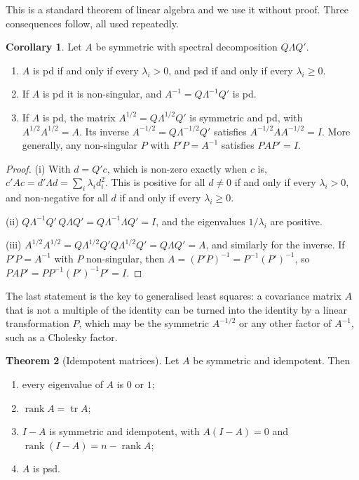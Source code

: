 \documentclass[11pt,a4paper]{article}
\numberwithin{equation}{section}
\DeclareMathOperator{\tr}{tr}
\DeclareMathOperator{\rank}{rank}
\theoremstyle{definition}
\newtheorem{thm}{Theorem}[subsection]
\newtheorem{coro}[thm]{Corollary}
\begin{document}
This is a standard theorem of linear algebra and we use it without proof. Three consequences follow, all used repeatedly.

\begin{coro}
\label{coro:pd}
Let $A$ be symmetric with spectral decomposition $Q\Lambda Q'$.
\begin{enumerate}[label=(\roman*)]
\item $A$ is pd if and only if every $\lambda_i > 0$, and psd if and only if every $\lambda_i \geq 0$.
\item If $A$ is pd it is non-singular, and $A^{-1} = Q\Lambda^{-1}Q'$ is pd.
\item If $A$ is pd, the matrix $A^{1/2} = Q\Lambda^{1/2}Q'$ is symmetric and pd, with $A^{1/2}A^{1/2} = A$. Its inverse $A^{-1/2} = Q\Lambda^{-1/2}Q'$
satisfies $A^{-1/2}AA^{-1/2} = I$. More generally, any non-singular $P$ with $P'P = A^{-1}$ satisfies $PAP' = I$.
\end{enumerate}
\end{coro}

\begin{proof}
(i) With $d = Q'c$, which is non-zero exactly when $c$ is, $c'Ac = d'\Lambda d = \sum_i\lambda_id_i^2$. This is positive for all $d \neq 0$ if and only if
every $\lambda_i > 0$, and non-negative for all $d$ if and only if every $\lambda_i \geq 0$.

(ii) $Q\Lambda^{-1}Q'\,Q\Lambda Q' = Q\Lambda^{-1}\Lambda Q' = I$, and the eigenvalues $1/\lambda_i$ are positive.

(iii) $A^{1/2}A^{1/2} = Q\Lambda^{1/2}Q'Q\Lambda^{1/2}Q' = Q\Lambda Q' = A$, and similarly for the inverse. If $P'P = A^{-1}$ with $P$ non-singular, then
$A = (P'P)^{-1} = P^{-1}(P')^{-1}$, so $PAP' = PP^{-1}(P')^{-1}P' = I$.
\end{proof}

The last statement is the key to generalised least squares: a covariance matrix $A$ that is not a multiple of the identity can be turned into the
identity by a linear transformation $P$, which may be the symmetric $A^{-1/2}$ or any other factor of $A^{-1}$, such as a Cholesky factor.

\begin{thm}[Idempotent matrices]
\label{thm:idem}
Let $A$ be symmetric and idempotent. Then
\begin{enumerate}[label=(\roman*)]
\item every eigenvalue of $A$ is $0$ or $1$;
\item $\rank A = \tr A$;
\item $I - A$ is symmetric and idempotent, with $A(I - A) = 0$ and $\rank(I - A) = n - \rank A$;
\item $A$ is psd.
\end{enumerate}
\end{thm}
\end{document}
